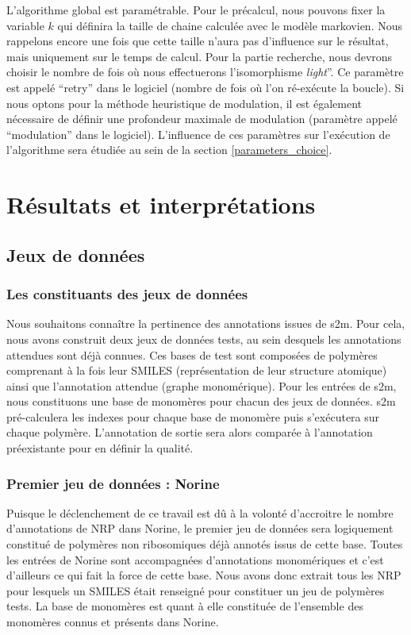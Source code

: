 L'algorithme global est paramétrable.
Pour le précalcul, nous pouvons fixer la variable $k$ qui définira la taille de chaine calculée avec le modèle markovien.
Nous rappelons encore une fois que cette taille n'aura pas d'influence sur le résultat, mais uniquement sur le temps de calcul.
Pour la partie recherche, nous devrons choisir le nombre de fois où nous effectuerons l'isomorphisme \textit{light}''.
Ce paramètre est appelé ``retry'' dans le logiciel (nombre de fois où l'on ré-exécute la boucle).
Si nous optons pour la méthode heuristique de modulation, il est également nécessaire de définir une profondeur maximale de modulation (paramètre appelé ``modulation'' dans le logiciel).
L'influence de ces paramètres sur l'exécution de l'algorithme sera étudiée au sein de la section \ref{parameters_choice}.




\section{Résultats et interprétations}

\subsection{Jeux de données}

\subsubsection{Les constituants des jeux de données}

Nous souhaitons connaître la pertinence des annotations issues de s2m.
Pour cela, nous avons construit deux jeux de données tests, au sein desquels les annotations attendues sont déjà connues.
Ces bases de test sont composées de polymères comprenant à la fois leur SMILES (représentation de leur structure atomique) ainsi que l'annotation attendue (graphe monomérique).
Pour les entrées de s2m, nous constituons une base de monomères pour chacun des jeux de données.
s2m pré-calculera les indexes pour chaque base de monomère puis s'exécutera sur chaque polymère.
L'annotation de sortie sera alors comparée à l'annotation préexistante pour en définir la qualité.


\subsubsection{Premier jeu de données : Norine}

Puisque le déclenchement de ce travail est dû à la volonté d'accroitre le nombre d'annotations de NRP dans Norine, le premier jeu de données sera logiquement constitué de polymères non ribosomiques déjà annotés issus de cette base.
Toutes les entrées de Norine sont accompagnées d'annotations monomériques et c'est d'ailleurs ce qui fait la force de cette base.
Nous avons donc extrait tous les NRP pour lesquels un SMILES était renseigné pour constituer un jeu de polymères tests.
La base de monomères est quant à elle constituée de l'ensemble des monomères connus et présents dans Norine.


